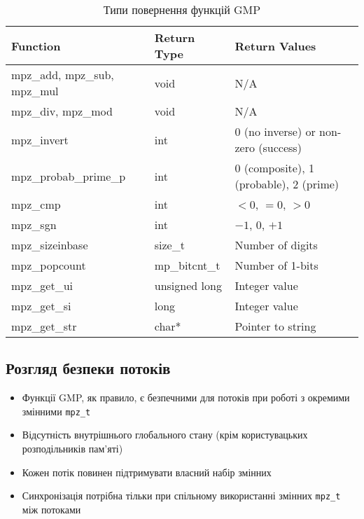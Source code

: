 \begin{table}[ht]
    \centering
    \begin{tabular}{|l|l|l|}
        \hline
        \textbf{Function}            & \textbf{Return Type} & \textbf{Return Values}                 \\
        \hline
        mpz\_add, mpz\_sub, mpz\_mul & void                 & N/A                                    \\
        mpz\_div, mpz\_mod           & void                 & N/A                                    \\
        mpz\_invert                  & int                  & 0 (no inverse) or non-zero (success)   \\
        mpz\_probab\_prime\_p        & int                  & 0 (composite), 1 (probable), 2 (prime) \\
        mpz\_cmp                     & int                  & $<0$, $=0$, $>0$                       \\
        mpz\_sgn                     & int                  & $-1$, $0$, $+1$                        \\
        mpz\_sizeinbase              & size\_t              & Number of digits                       \\
        mpz\_popcount                & mp\_bitcnt\_t        & Number of 1-bits                       \\
        mpz\_get\_ui                 & unsigned long        & Integer value                          \\
        mpz\_get\_si                 & long                 & Integer value                          \\
        mpz\_get\_str                & char*                & Pointer to string                      \\
        \hline
    \end{tabular}
    \caption{Типи повернення функцій GMP}
\end{table}

\subsection{Розгляд безпеки потоків}
\begin{itemize}
    \item Функції GMP, як правило, є безпечними для потоків при роботі з окремими змінними \texttt{mpz\_t}
    \item Відсутність внутрішнього глобального стану (крім користувацьких розподільників пам'яті)
    \item Кожен потік повинен підтримувати власний набір змінних
    \item Синхронізація потрібна тільки при спільному використанні змінних \texttt{mpz\_t} між потоками
\end{itemize}

